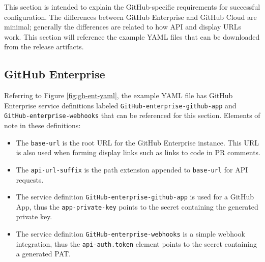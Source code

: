This section is intended to explain the GitHub-specific requirements for successful configuration.  The differences
between GitHub Enterprise and GitHub Cloud are minimal; generally the differences are related to how API and display URLs
work.  This section will reference the example YAML files that can be downloaded from the \cxoneflow release artifacts.

\subsection{GitHub Enterprise}

Referring to Figure \ref{fig:gh-ent-yaml}, the example YAML file has GitHub Enterprise
service definitions labeled \texttt{GitHub-enterprise-github-app} and \texttt{GitHub-enterprise-webhooks}
that can be referenced for this section.  Elements of note in these definitions:

\begin{itemize}
    \item The \texttt{base-url} is the root URL for the GitHub Enterprise instance.  This URL is also used
    when forming display links such as links to code in PR comments.
    \item The \texttt{api-url-suffix} is the path extension appended to \texttt{base-url} for API requests.
    \item The service definition \texttt{GitHub-enterprise-github-app} is used for a GitHub App, thus the \texttt{app-private-key} points to the secret
    containing the generated private key.
    \item The service definition \texttt{GitHub-enterprise-webhooks} is a simple webhook integration, thus the \texttt{api-auth.token} element 
    points to the secret containing a generated PAT.
\end{itemize}


